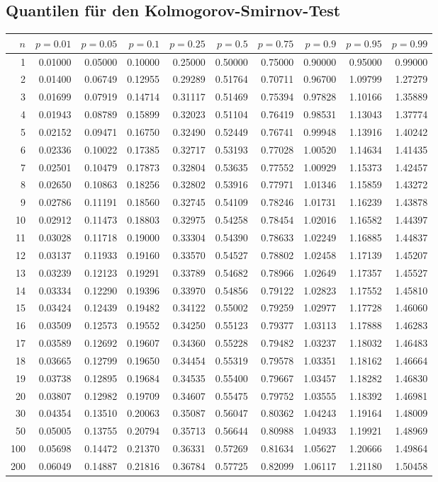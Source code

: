 	\subsection{Quantilen für den Kolmogorov-Smirnov-Test}
	\begin{minipage}{18cm}
    	\centering
    	\scriptsize
\begin{tabular}{|r|rrr|rrr|rrr|}
\hline
$n$&$p=0.01$&$p=0.05$&$p=0.1$&$p=0.25$&$p=0.5$&$p=0.75$&$p=0.9$&$p=0.95$&$p=0.99$\\
\hline
1&0.01000&0.05000&0.10000&0.25000&0.50000&0.75000&0.90000&0.95000&0.99000\\
2&0.01400&0.06749&0.12955&0.29289&0.51764&0.70711&0.96700&1.09799&1.27279\\
3&0.01699&0.07919&0.14714&0.31117&0.51469&0.75394&0.97828&1.10166&1.35889\\
4&0.01943&0.08789&0.15899&0.32023&0.51104&0.76419&0.98531&1.13043&1.37774\\
5&0.02152&0.09471&0.16750&0.32490&0.52449&0.76741&0.99948&1.13916&1.40242\\
6&0.02336&0.10022&0.17385&0.32717&0.53193&0.77028&1.00520&1.14634&1.41435\\
7&0.02501&0.10479&0.17873&0.32804&0.53635&0.77552&1.00929&1.15373&1.42457\\
8&0.02650&0.10863&0.18256&0.32802&0.53916&0.77971&1.01346&1.15859&1.43272\\
9&0.02786&0.11191&0.18560&0.32745&0.54109&0.78246&1.01731&1.16239&1.43878\\
10&0.02912&0.11473&0.18803&0.32975&0.54258&0.78454&1.02016&1.16582&1.44397\\
11&0.03028&0.11718&0.19000&0.33304&0.54390&0.78633&1.02249&1.16885&1.44837\\
12&0.03137&0.11933&0.19160&0.33570&0.54527&0.78802&1.02458&1.17139&1.45207\\
13&0.03239&0.12123&0.19291&0.33789&0.54682&0.78966&1.02649&1.17357&1.45527\\
14&0.03334&0.12290&0.19396&0.33970&0.54856&0.79122&1.02823&1.17552&1.45810\\
15&0.03424&0.12439&0.19482&0.34122&0.55002&0.79259&1.02977&1.17728&1.46060\\
16&0.03509&0.12573&0.19552&0.34250&0.55123&0.79377&1.03113&1.17888&1.46283\\
17&0.03589&0.12692&0.19607&0.34360&0.55228&0.79482&1.03237&1.18032&1.46483\\
18&0.03665&0.12799&0.19650&0.34454&0.55319&0.79578&1.03351&1.18162&1.46664\\
19&0.03738&0.12895&0.19684&0.34535&0.55400&0.79667&1.03457&1.18282&1.46830\\
20&0.03807&0.12982&0.19709&0.34607&0.55475&0.79752&1.03555&1.18392&1.46981\\
30&0.04354&0.13510&0.20063&0.35087&0.56047&0.80362&1.04243&1.19164&1.48009\\
50&0.05005&0.13755&0.20794&0.35713&0.56644&0.80988&1.04933&1.19921&1.48969\\
100&0.05698&0.14472&0.21370&0.36331&0.57269&0.81634&1.05627&1.20666&1.49864\\
200&0.06049&0.14887&0.21816&0.36784&0.57725&0.82099&1.06117&1.21180&1.50458\\


\end{tabular}
\end{minipage}
